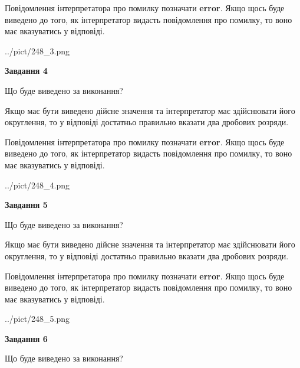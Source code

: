 \documentclass[12pt, ukrainian]{article}
\begin{document}
{\begin {Large}
Повідомлення інтерпретатора про помилку позначати \textbf{error}.
Якщо щось буде виведено до того, як інтерпретатор видасть повідомлення про помилку, 
то воно має вказуватись у відповіді. \par

\begin{center}
	{../pict/248_3.png}
\end{center}
\newpage

{\begin {center}\textbf{Завдання 4}\end {center}}\par
Що буде виведено за виконання? \par

Якщо має бути виведено дійсне значення та інтерпретатор має здійснювати його округлення, 
то у відповіді достатньо правильно вказати два дробових розряди.

Повідомлення інтерпретатора про помилку позначати \textbf{error}.
Якщо щось буде виведено до того, як інтерпретатор видасть повідомлення про помилку, 
то воно має вказуватись у відповіді. \par

\begin{center}
	{../pict/248_4.png}
\end{center}
\newpage

{\begin {center}\textbf{Завдання 5}\end {center}}\par
Що буде виведено за виконання? \par

Якщо має бути виведено дійсне значення та інтерпретатор має здійснювати його округлення, 
то у відповіді достатньо правильно вказати два дробових розряди.

Повідомлення інтерпретатора про помилку позначати \textbf{error}.
Якщо щось буде виведено до того, як інтерпретатор видасть повідомлення про помилку, 
то воно має вказуватись у відповіді. \par

\begin{center}
	{../pict/248_5.png}
\end{center}
\newpage

{\begin {center}\textbf{Завдання 6}\end {center}}\par
Що буде виведено за виконання? \par


\end{Large}}
\end{document}
